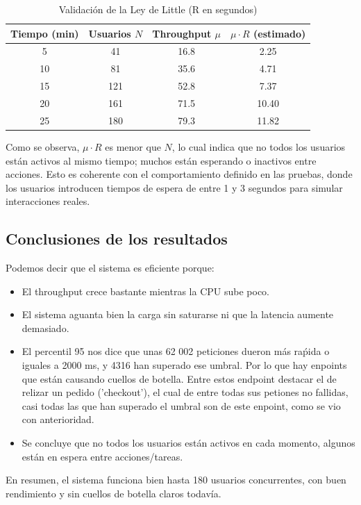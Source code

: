 \documentclass[10pt]{book}
\begin{document}
\begin{table}[H]
\centering
\begin{tabular}{|c|c|c|c|}
\hline
\textbf{Tiempo (min)} & \textbf{Usuarios \(N\)} & \textbf{Throughput \(\mu\)} & \textbf{\(\mu \cdot R\) (estimado)} \\
\hline
5  & 41  & 16.8  & 2.25 \\
10 & 81  & 35.6  & 4.71 \\
15 & 121 & 52.8  & 7.37 \\
20 & 161 & 71.5  & 10.40 \\
25 & 180 & 79.3  & 11.82 \\
\hline
\end{tabular}
\caption{Validación de la Ley de Little (R en segundos)}
\end{table}

Como se observa, \(\mu \cdot R\) es menor que \(N\), lo cual indica que no todos los usuarios están activos al mismo tiempo; muchos están esperando o inactivos entre acciones. Esto es coherente con el comportamiento definido en las pruebas, donde los usuarios introducen tiempos de espera de entre 1 y 3 segundos para simular interacciones reales.

\subsection{Conclusiones de los resultados}

Podemos decir que el sistema es eficiente porque:

\begin{itemize}
    \item El throughput crece bastante mientras la CPU sube poco.
    \item El sistema aguanta bien la carga sin saturarse ni que la latencia aumente demasiado.
    \item El percentil 95 nos dice que unas 62 002 peticiones dueron más raṕida o iguales a 2000 ms, y 4316 han superado ese umbral. Por lo que hay enpoints que están causando cuellos de botella. Entre estos endpoint destacar el de relizar un pedido ('checkout'), el cual de entre todas sus petiones no fallidas, casi todas las que han superado el umbral son de este enpoint, como se vio con anterioridad.
    \item Se concluye que no todos los usuarios están activos en cada momento, algunos están en espera entre acciones/tareas.
\end{itemize}

En resumen, el sistema funciona bien hasta 180 usuarios concurrentes, con buen rendimiento y sin cuellos de botella claros todavía.
\end{document}
